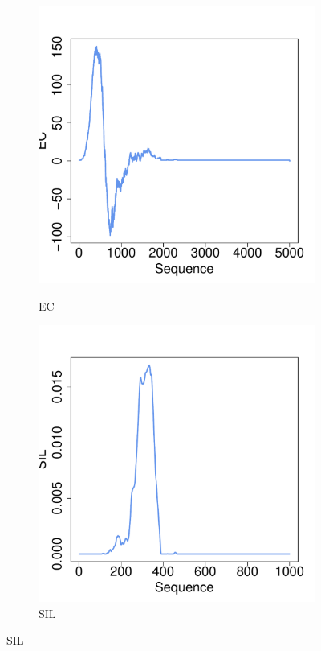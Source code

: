 \documentclass[12pt]{article}
\begin{document}
\begin{figure}[htbp]
\begin{subfigure}{.24\textwidth}
    \label{fig:examplestest2}
  \end{subfigure}
    \begin{subfigure}{.24\textwidth}
    \centering
        \caption{EC}
        \includegraphics[width=\linewidth]{figure_5_euler.pdf}
    \label{fig:examplestest3}
  \end{subfigure}
    \begin{subfigure}{.24\textwidth}
    \centering
        \caption{SIL}
        \includegraphics[width=\linewidth]{figure_5_silhouette.pdf}

\end{subfigure}
\end{figure}
\end{document}
